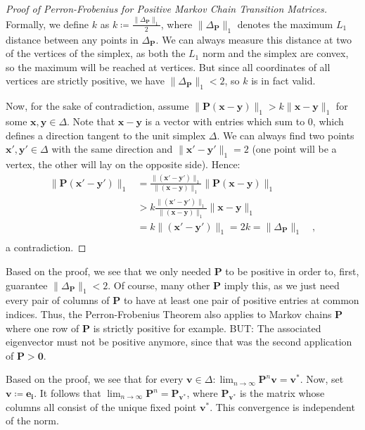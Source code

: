 \documentclass[../../main.tex]{subfiles}
\begin{document}
\begin{proof}[Proof of Perron-Frobenius for Positive Markov Chain Transition Matrices]
    Formally, we define $k$ as $k \coloneqq \frac{\|\Delta_{\bm{P}}\|_1}{2}$, where $\|\Delta_{\bm{P}}\|_1$ denotes the maximum $L_1$ distance between any points in $\Delta_{\bm{P}}$. We can always measure this distance at two of the vertices of the simplex, as both the $L_1$ norm and the simplex are convex, so the maximum will be reached at vertices. But since all coordinates of all vertices are strictly positive, we have $\|\Delta_{\bm{P}}\|_1 < 2$, so $k$ is in fact valid.

    Now, for the sake of contradiction, assume $\|\bm{P} (\bm{x} - \bm{y})\|_1 > k \|\bm{x} - \bm{y}\|_1$ for some $\bm{x}, \bm{y} \in \Delta$. Note that $\bm{x} - \bm{y}$ is a vector with entries which sum to $0$, which defines a direction tangent to the unit simplex $\Delta$. We can always find two points $\bm{x}', \bm{y}' \in \Delta$ with the same direction and $\|\bm{x}' - \bm{y}'\|_1 = 2$ (one point will be a vertex, the other will lay on the opposite side). Hence:
    \begin{align*}
        \|\bm{P} (\bm{x}' - \bm{y}')\|_1 &= \frac{\|(\bm{x}' - \bm{y}')\|_1}{\|(\bm{x} - \bm{y})\|_1} \|\bm{P} (\bm{x} - \bm{y})\|_1 \\
        &> k \frac{\|(\bm{x}' - \bm{y}')\|_1}{\|(\bm{x} - \bm{y})\|_1} \|\bm{x} - \bm{y}\|_1 \\
        &= k \|(\bm{x}' - \bm{y}')\|_1 = 2k = \|\Delta_{\bm{P}}\|_1 \quad , \\
    \end{align*}
    a contradiction.
\end{proof}

\begin{corollary}
    \label{corollary:perron_frobenius_extension}
    Based on the proof, we see that we only needed $\bm{P}$ to be positive in order to, first, guarantee $\|\Delta_{\bm{P}}\|_1 < 2$. Of course, many other $\bm{P}$ imply this, as we just need every pair of columns of $\bm{P}$ to have at least one pair of positive entries at common indices. Thus, the Perron-Frobenius Theorem also applies to Markov chains $\bm{P}$ where one row of $\bm{P}$ is strictly positive for example. BUT: The associated eigenvector must not be positive anymore, since that was the second application of $\bm{P} > \bm{0}$.
\end{corollary}

\begin{corollary}
    Based on the proof, we see that for every $\bm{v} \in \Delta: \lim_{n \to \infty} \bm{P}^n \bm{v} = \bm{v}^*$. Now, set $\bm{v} \coloneqq \bm{e_i}$. It follows that $\lim_{n \to \infty} \bm{P}^n = \bm{P}_{\bm{v}^*}$, where $\bm{P}_{\bm{v}^*}$ is the matrix whose columns all consist of the unique fixed point $\bm{v}^*$. This convergence is independent of the norm.
\end{corollary}
\end{document}
